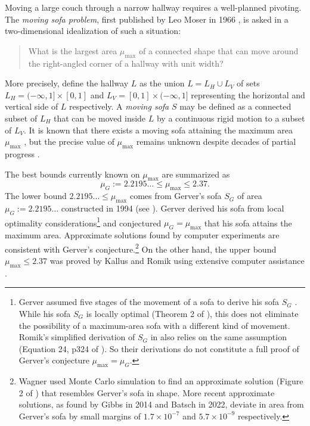 Moving a large couch through a narrow hallway requires a well-planned pivoting. The \emph{moving sofa problem}, first published by Leo Moser in 1966 \autocite{moser1966problem}, is asked in a two-dimensional idealization of such a situation:

\begin{quote}
What is the largest area \(\mu_{\text{max}}\) of a connected shape that can move around the right-angled corner of a hallway with unit width?
\end{quote}

More precisely, define the hallway \(L\) as the union \(L = L_H \cup L_V\) of sets \(L_H = (-\infty, 1] \times [0, 1]\) and \(L_V = [0, 1] \times (-\infty, 1]\) representing the horizontal and vertical side of \(L\) respectively. A \emph{moving sofa} \(S\) may be defined as a connected subset of \(L_H\) that can be moved inside \(L\) by a continuous rigid motion to a subset of \(L_V\). It is known that there exists a moving sofa attaining the maximum area \(\mu_{\text{max}}\) \autocite{gerverMovingSofaCorner1992,croft2012unsolved}, but the precise value of \(\mu_{\text{max}}\) remains unknown despite decades of partial progress \autocite{hammersley1968enfeeblement,gerverMovingSofaCorner1992,romikDifferentialEquationsExact2018,kallusImprovedUpperBounds2018}.

The best bounds currently known on \(\mu_{\max}\) are summarized as
\begin{equation}
\label{eqn:best-bounds}
\mu_G := 2.2195\dots \leq \mu_{\max} \leq 2.37.
\end{equation}
The lower bound \(2.2195\dots \leq \mu_{\max}\) comes from Gerver’s sofa \(S_G\) of area \(\mu_G := 2.2195\dots\) constructed in 1994 \autocite{gerverMovingSofaCorner1992} (see ). Gerver derived his sofa from local optimality considerations\footnote{Gerver assumed five stages of the movement of a sofa to derive his sofa \(S_G\) \autocite{gerverMovingSofaCorner1992}. While his sofa \(S_G\) is locally optimal (Theorem 2 of \autocite{gerverMovingSofaCorner1992}), this does not eliminate the possibility of a maximum-area sofa with a different kind of movement. Romik’s simplified derivation of \(S_G\) in \autocite{romikDifferentialEquationsExact2018} also relies on the same assumption (Equation 24, p324 of \autocite{romikDifferentialEquationsExact2018}). So their derivations do not constitute a full proof of Gerver’s conjecture \(\mu_{\max} = \mu_G\).} and conjectured \(\mu_G = \mu_{\max}\) that his sofa attains the maximum area. Approximate solutions found by computer experiments are consistent with Gerver’s conjecture.\footnote{Wagner used Monte Carlo simulation to find an approximate solution (Figure 2 of \autocite{wagner1976sofa}) that resembles Gerver’s sofa in shape. More recent approximate solutions, as found by Gibbs \autocite{gibbsComputationalStudySofas} in 2014 and Batsch \autocite{batschNumericalApproachAnalysing2022} in 2022, deviate in area from Gerver’s sofa by small margins of \(1.7 \times 10^{-7}\) and \(5.7 \times 10^{-9}\) respectively.} On the other hand, the upper bound \(\mu_{\max} \leq 2.37\) was proved by Kallus and Romik using extensive computer assistance \autocite{kallusImprovedUpperBounds2018}.

